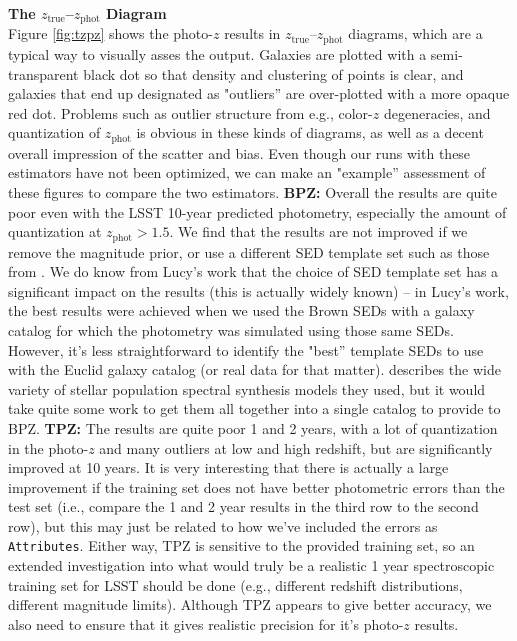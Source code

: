\documentclass[DM,lsstdraft,toc]{lsstdoc}
\begin{document}
\smallskip \noindent \textbf{The $z_\mathrm{true}$--$z_\mathrm{phot}$ Diagram} \\
Figure \ref{fig:tzpz} shows the photo-$z$ results in $z_\mathrm{true}$--$z_\mathrm{phot}$ diagrams, which are a typical way to visually asses the output. Galaxies are plotted with a semi-transparent black dot so that density and clustering of points is clear, and galaxies that end up designated as "outliers'' are over-plotted with a more opaque red dot. Problems such as outlier structure from e.g., color-$z$ degeneracies, and quantization of $z_\mathrm{phot}$ is obvious in these kinds of diagrams, as well as a decent overall impression of the scatter and bias. Even though our runs with these estimators have not been optimized, we can make an "example'' assessment of these figures to compare the two estimators.
\textbf{BPZ:} Overall the results are quite poor even with the LSST 10-year predicted photometry, especially the amount of quantization at $z_\mathrm{phot}>1.5$. We find that the results are not improved if we remove the magnitude prior, or use a different SED template set such as those from \cite{2014ApJS..212...18B}. We do know from Lucy's work that the choice of SED template set has a significant impact on the results (this is actually widely known) -- in Lucy's work, the best results were achieved when we used the Brown SEDs with a galaxy catalog for which the photometry was simulated using those same SEDs. However, it's less straightforward to identify the "best'' template SEDs to use with the Euclid galaxy catalog (or real data for that matter). \cite{2014MNRAS.439..264G} describes the wide variety of stellar population spectral synthesis models they used, but it would take quite some work to get them all together into a single catalog to provide to BPZ.
\textbf{TPZ:} The results are quite poor 1 and 2 years, with a lot of quantization in the photo-$z$ and many outliers at low and high redshift, but are significantly improved at 10 years. It is very interesting that there is actually a large improvement if the training set does not have better photometric errors than the test set (i.e., compare the 1 and 2 year results in the third row to the second row), but this may just be related to how we've included the errors as \texttt{Attributes}. Either way, TPZ is sensitive to the provided training set, so an extended investigation into what would truly be a realistic 1 year spectroscopic training set for LSST should be done (e.g., different redshift distributions, different magnitude limits). Although TPZ appears to give better accuracy, we also need to ensure that it gives realistic precision for it's photo-$z$ results.
\end{document}
